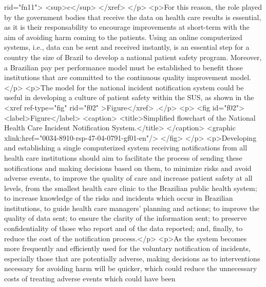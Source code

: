               rid="fn11">
              <sup>c</sup>
            </xref>
          </p>
          <p>For this reason, the role played by the government bodies that receive the data on
            health care results is essential, as it is their responsability to encourage
            improvements at short-term with the aim of avoiding harm coming to the patients. Using
            an online computerized systems, i.e., data can be sent and received instantly, is an
            essential step for a country the size of Brazil to develop a national patient safety
            program. Moreover, a Brazilian pay per performance model must be established to benefit
            those institutions that are committed to the continuous quality improvement model.</p>
          <p>The model for the national incident notification system could be useful in developing a
            culture of patient safety within the SUS, as shown in the <xref ref-type="fig" rid="f02"
              >Figure</xref> .</p>
          <p>
            <fig id="f02">
              <label>Figure</label>
              <caption>
                <title>Simplified flowchart of the National Health Care Incident Notification
                  System.</title>
              </caption>
              <graphic xlink:href="0034-8910-rsp-47-04-0791-gf01-en"/>
            </fig>
          </p>
          <p>Developing and establishing a single computerized system receiving notifications from
            all health care institutions should aim to facilitate the process of sending these
            notifications and making decisions based on them, to minimize risks and avoid adverse
            events, to improve the quality of care and increase patient safety at all levels, from
            the smallest health care clinic to the Brazilian public health system; to increase
            knowledge of the risks and incidents which occur in Brazilian institutions, to guide
            health care managers’ planning and actions; to improve the quality of data sent; to
            ensure the clarity of the information sent; to preserve confidentiality of those who
            report and of the data reported; and, finally, to reduce the cost of the notification
            process.</p>
          <p>As the system becomes more frequently and efficiently used for the voluntary
            notification of incidents, especially those that are potentially adverse, making
            decisions as to interventions necessary for avoiding harm will be quicker, which could
            reduce the unnecessary costs of treating adverse events which could have been
